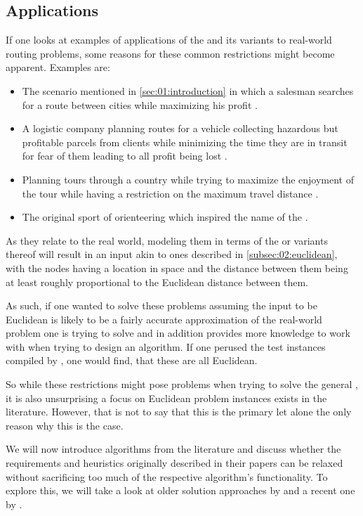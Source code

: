 \subsection{Applications}
\label{subsec:02:reasons}

If one looks at examples of applications of the \oplong{} and its variants to real-world routing problems,
some reasons for these common restrictions might become apparent. Examples are:
\begin{itemize}
	\item The scenario mentioned in \cref{sec:01:introduction} in which a salesman searches for a route between cities while maximizing his profit \cite{chao_fast_1996}.
	\item A logistic company planning routes for a vehicle collecting hazardous but profitable parcels from clients while minimizing the time they are in transit for fear of them leading to all profit being lost \cite{santini_hazardous_2022}.
	\item Planning tours through a country while trying to maximize the enjoyment of the tour while having a restriction on the maximum travel distance \cite{geem_harmony_2005}.
  \item The original sport of orienteering which inspired the name of the \op{} \cite{tsiligiridis_heuristic_1984}.
\end{itemize}

As they relate to the real world, modeling them in terms of the \op{} or variants thereof
will result in an input akin to ones described in \cref{subsec:02:euclidean},
with the nodes having a location in space and the distance between them being at least roughly proportional to the Euclidean distance between them.

As such, if one wanted to solve these problems assuming the input to be Euclidean is likely to be a fairly accurate approximation of the real-world problem one is trying to solve and in addition provides more knowledge to work with when trying to design an algorithm.
If one perused the test instances compiled by \citeauthor{vansteenwegen_orienteering_2011} \cite{vansteenwegen_orienteering_2011},
one would find, that these are all Euclidean.

So while these restrictions might pose problems when trying to solve the general \op{}, it is also unsurprising a focus on Euclidean problem instances exists in the literature.
However, that is not to say that this is the primary let alone the only reason why this is the case.

We will now introduce algorithms from the literature and discuss
whether the requirements and heuristics originally described in their papers can be relaxed without sacrificing too much of the respective algorithm's functionality.
To explore this, we will take a look at older solution approaches by \citeauthor{tsiligiridis_heuristic_1984} \cite{tsiligiridis_heuristic_1984} and a recent one by \citeauthor{szwarc_novel_2022}. \cite{szwarc_novel_2022}
